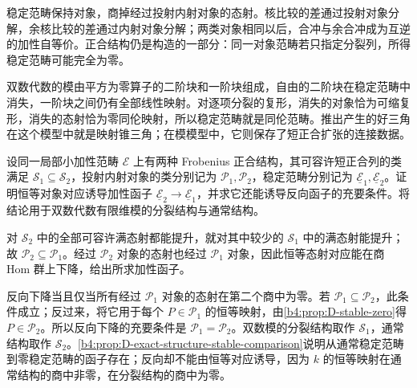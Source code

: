 



\begin{chaptersummary}
	稳定范畴保持对象，商掉经过投射内射对象的态射。核比较的差通过投射对象分解，余核比较的差通过内射对象分解；两类对象相同以后，合冲与余合冲成为互逆的加性自等价。正合结构仍是构造的一部分：同一对象范畴若只指定分裂列，所得稳定范畴可能完全为零。

	\ProseParagraphBreak
	双数代数的模由平方为零算子的二阶块和一阶块组成，自由的二阶块在稳定范畴中消失，一阶块之间仍有全部线性映射。对逐项分裂的复形，消失的对象恰为可缩复形，消失的态射恰为零同伦映射，所以稳定范畴就是同伦范畴。推出产生的好三角在这个模型中就是映射锥三角；在模模型中，它则保存了短正合扩张的连接数据。
\end{chaptersummary}

\BookExercises

\begin{exercise}\label{b4:ex:D-change-exact-structure}
	设同一局部小加性范畴 \(\mathcal E\) 上有两种 Frobenius 正合结构，其可容许短正合列的类满足 \(\mathcal S_1\subseteq\mathcal S_2\)，投射内射对象的类分别记为 \(\mathcal P_1,\mathcal P_2\)，稳定范畴分别记为 \(\underline{\mathcal E}_1,\underline{\mathcal E}_2\)。证明恒等对象对应诱导加性函子 \(\underline{\mathcal E}_2\to\underline{\mathcal E}_1\)，并求它还能诱导反向函子的充要条件。将结论用于双数代数有限维模的分裂结构与通常结构。
\end{exercise}
\begin{solution}
	对 \(\mathcal S_2\) 中的全部可容许满态射都能提升，就对其中较少的 \(\mathcal S_1\) 中的满态射能提升；故 \(\mathcal P_2\subseteq\mathcal P_1\)。经过 \(\mathcal P_2\) 对象的态射也经过 \(\mathcal P_1\) 对象，因此恒等态射对应能在商 Hom 群上下降，给出所求加性函子。

	反向下降当且仅当所有经过 \(\mathcal P_1\) 对象的态射在第二个商中为零。若 \(\mathcal P_1\subseteq\mathcal P_2\)，此条件成立；反过来，将它用于每个 \(P\in\mathcal P_1\) 的恒等映射，由\cref{b4:prop:D-stable-zero}得 \(P\in\mathcal P_2\)。所以反向下降的充要条件是 \(\mathcal P_1=\mathcal P_2\)。双数模的分裂结构取作 \(\mathcal S_1\)，通常结构取作 \(\mathcal S_2\)。\cref{b4:prop:D-exact-structure-stable-comparison}说明从通常稳定范畴到零稳定范畴的函子存在；反向却不能由恒等对应诱导，因为 \(k\) 的恒等映射在通常结构的商中非零，在分裂结构的商中为零。
\end{solution}

